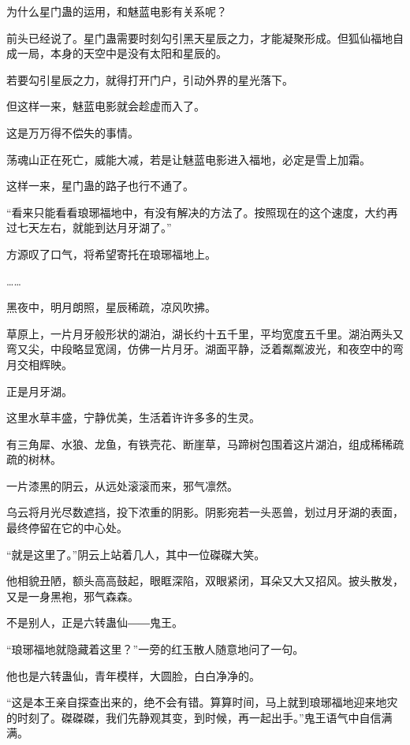 \begin{this_body}
为什么星门蛊的运用，和魅蓝电影有关系呢？

前头已经说了。星门蛊需要时刻勾引黑天星辰之力，才能凝聚形成。但狐仙福地自成一局，本身的天空中是没有太阳和星辰的。

若要勾引星辰之力，就得打开门户，引动外界的星光落下。

但这样一来，魅蓝电影就会趁虚而入了。

这是万万得不偿失的事情。

荡魂山正在死亡，威能大减，若是让魅蓝电影进入福地，必定是雪上加霜。

这样一来，星门蛊的路子也行不通了。

“看来只能看看琅琊福地中，有没有解决的方法了。按照现在的这个速度，大约再过七天左右，就能到达月牙湖了。”

方源叹了口气，将希望寄托在琅琊福地上。

……

黑夜中，明月朗照，星辰稀疏，凉风吹拂。

草原上，一片月牙般形状的湖泊，湖长约十五千里，平均宽度五千里。湖泊两头又弯又尖，中段略显宽阔，仿佛一片月牙。湖面平静，泛着粼粼波光，和夜空中的弯月交相辉映。

正是月牙湖。

这里水草丰盛，宁静优美，生活着许许多多的生灵。

有三角犀、水狼、龙鱼，有铁壳花、断崖草，马蹄树包围着这片湖泊，组成稀稀疏疏的树林。

一片漆黑的阴云，从远处滚滚而来，邪气凛然。

乌云将月光尽数遮挡，投下浓重的阴影。阴影宛若一头恶兽，划过月牙湖的表面，最终停留在它的中心处。

“就是这里了。”阴云上站着几人，其中一位磔磔大笑。

他相貌丑陋，额头高高鼓起，眼眶深陷，双眼紧闭，耳朵又大又招风。披头散发，又是一身黑袍，邪气森森。

不是别人，正是六转蛊仙――鬼王。

“琅琊福地就隐藏着这里？”一旁的红玉散人随意地问了一句。

他也是六转蛊仙，青年模样，大圆脸，白白净净的。

“这是本王亲自探查出来的，绝不会有错。算算时间，马上就到琅琊福地迎来地灾的时刻了。磔磔磔，我们先静观其变，到时候，再一起出手。”鬼王语气中自信满满。

\end{this_body}


